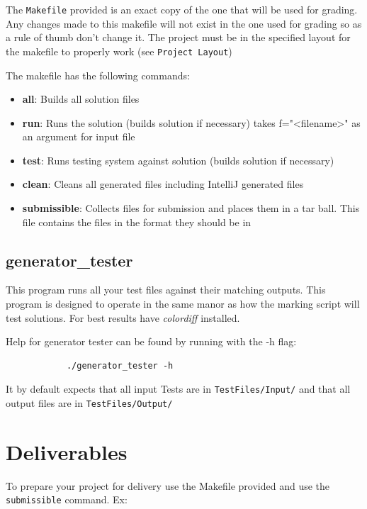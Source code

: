 \documentclass{article}
\begin{document}
		The \texttt{Makefile} provided is an exact copy of the one that will be used for grading.  Any changes made to
		this makefile will not exist in the one used for grading so as a rule of thumb don't change it. The project must
		be in the specified layout for the makefile to properly work (see \texttt{Project Layout})
		
		The makefile has the following commands:
		
		\begin{itemize}
			\item{\textbf{all}}: Builds all solution files
			\item{\textbf{run}}: Runs the solution (builds solution if necessary) takes f="<filename>" as an argument for
				input file
			\item{\textbf{test}}: Runs testing system against solution (builds solution if necessary)
			\item{\textbf{clean}}: Cleans all generated files including IntelliJ generated files
			\item{\textbf{submissible}}: Collects files for submission and places them in a tar ball. This file contains
			the files in the format they should be in
		\end{itemize}

	\subsection{generator\_tester}
	
		This program runs all your test files against their matching outputs. This program is designed to operate in the
		same manor as how the marking script will test solutions. For best results have \textit{colordiff} installed.
		
		Help for generator tester can be found by running with the -h flag:
		
		\begin{lstlisting}
			./generator_tester -h
		\end{lstlisting}
		
		It by default expects that all input Tests are in \texttt{TestFiles/Input/} and that  all output files are in
		\texttt{TestFiles/Output/}

\section{Deliverables}

	To prepare your project for delivery use the Makefile provided and use the \texttt{submissible} command. Ex:
	
\end{document}
